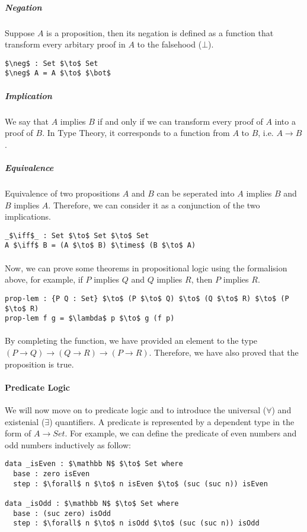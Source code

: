 \subparagraph{Negation} Suppose \(A\) is a proposition, then its negation is
defined as a function that transform every arbitary proof in \(A\) to
the falsehood (\(\bot\)). 
\begin{lstlisting}[mathescape=true,xleftmargin=.3\textwidth]
$\neg$ : Set $\to$ Set
$\neg$ A = A $\to$ $\bot$
\end{lstlisting} 


\subparagraph{Implication} We say that \(A\) implies \(B\) if and only if we can
transform every proof of \(A\) into a proof of \(B\). In Type
Theory, it corresponds to a function from \(A\) to \(B\), i.e. \(A \to
B\). 

\subparagraph{Equivalence} Equivalence of two propositions \(A\) and
\(B\) can be seperated into \(A\) implies \(B\) and \(B\) implies
\(A\). Therefore, we can consider it as a conjunction of the two
implications.
\begin{lstlisting}[mathescape=true,xleftmargin=.3\textwidth]
_$\iff$_ : Set $\to$ Set $\to$ Set
A $\iff$ B = (A $\to$ B) $\times$ (B $\to$ A)
\end{lstlisting} 


\paragraph{} Now, we can prove some theorems in propositional logic
using the formalision above, for example, if \(P\) implies \(Q\) and
\(Q\) implies \(R\), then \(P\) implies \(R\). 
\begin{lstlisting}[mathescape=true,xleftmargin=.3\textwidth]
prop-lem : {P Q : Set} $\to$ (P $\to$ Q) $\to$ (Q $\to$ R) $\to$ (P $\to$ R)
prop-lem f g = $\lambda$ p $\to$ g (f p)
\end{lstlisting} 

\paragraph{} By completing the function, we have provided an element
to the type \((P \to Q) \to (Q \to R) \to (P \to R)\). Therefore, we have
also proved that the proposition is true. 


\paragraph{Predicate Logic} We will now move on to predicate logic and
to introduce the universal (\(\forall\)) and existenial (\(\exists\))
quantifiers. A predicate is represented by a dependent type in the
form of \(A \to Set\). For example, we can
define the predicate of even numbers and odd numbers inductively as follow:
\begin{lstlisting}[mathescape=true,xleftmargin=.25\textwidth]
data _isEven : $\mathbb N$ $\to$ Set where
  base : zero isEven
  step : $\forall$ n $\to$ n isEven $\to$ (suc (suc n)) isEven

data _isOdd : $\mathbb N$ $\to$ Set where
  base : (suc zero) isOdd
  step : $\forall$ n $\to$ n isOdd $\to$ (suc (suc n)) isOdd
\end{lstlisting} 


